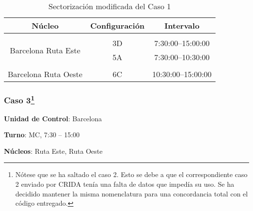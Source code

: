 \begin{table}[h]
	\centering
	\caption{Sectorización modificada del Caso 1}
	\begin{tabular}{ccc}
		\hline
		\textbf{Núcleo}                                           & \textbf{Configuración} & \textbf{Intervalo}   \\ \hline
		\multicolumn{1}{l}{}                                      & \multicolumn{1}{l}{}   & \multicolumn{1}{l}{} \\
		\multicolumn{1}{c|}{\multirow{2}{*}{Barcelona Ruta Este}} & 3D                     & 7:30:00--15:00:00    \\
		\multicolumn{1}{c|}{}                                     & 5A                     & 7:30:00--10:30:00    \\
		\multicolumn{1}{l}{}                                      & \multicolumn{1}{l}{}   & \multicolumn{1}{l}{} \\
		Barcelona Ruta Oeste                                      & 6C                     & 10:30:00--15:00:00   \\ \hline
	\end{tabular}
	\label{table:5:caso1-modif}
\end{table}


\subsubsection[Caso 3]{Caso 3\footnote{Nótese que se ha saltado el caso 2. Esto se debe a que el correspondiente caso 2 enviado por \gls{CRIDA} tenía una falta de datos que impedía su uso. Se ha decidido mantener la misma nomenclatura para una concordancia total con el código entregado.}}

\textbf{Unidad de Control}: Barcelona

\textbf{Turno}: MC, 7:30 -- 15:00

\textbf{Núcleos}: Ruta Este, Ruta Oeste

